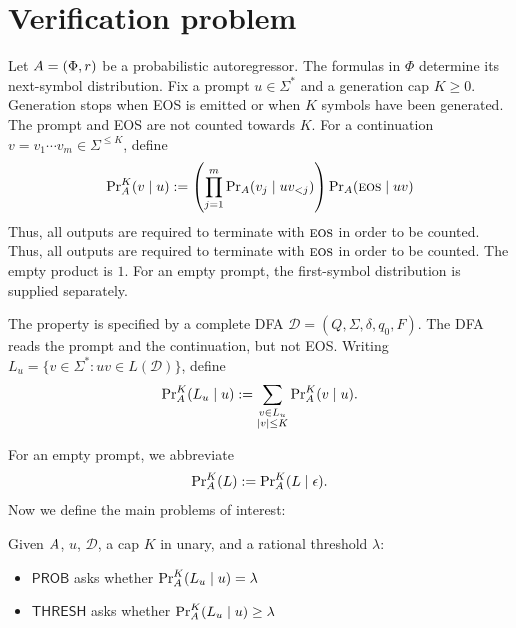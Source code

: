 \documentclass[acmsmall,screen,review,anonymous,nonacm]{PLDI/acmart}
\begin{document}
\section{Verification problem}
\label{sec:verification-problem}

Let $\autoregressor=(\Phi,r)$ be a probabilistic autoregressor.
The formulas in $\Phi$ determine its next-symbol distribution.
Fix a prompt $u\in\Sigma^*$ and a generation cap $K\geq0$.
Generation stops when EOS is emitted or when $K$ symbols have been
generated. The prompt and EOS are not counted towards $K$.
For a continuation $v=v_1\cdots v_m\in\Sigma^{\leq K}$, define
\[
\ksufprob{\autoregressor}{K}{u}{v}
:=\left(\prod_{j=1}^{m}
\symprob{\autoregressor}{uv_{<j}}{v_j}\right)
\symprob{\autoregressor}{uv}{\eos}
\]
Thus, all outputs are required to terminate with $\eos$ in order to be counted.
Thus, all outputs are required to terminate with $\eos$ in order to be counted.
The empty product is $1$. For an empty prompt, the first-symbol
distribution is supplied separately.

The property is specified by a complete DFA
$\mathcal D=(Q,\Sigma,\delta,q_0,F)$.
The DFA reads the prompt and the continuation, but not EOS.
Writing $L_u=\{v\in\Sigma^*:uv\in L(\mathcal D)\}$, define
\[
\ksufprob{\autoregressor}{K}{u}{L_u}
:=
\sum_{\substack{v\in L_u\\|v|\leq K}}
\ksufprob{\autoregressor}{K}{u}{v}.
\]

For an empty prompt, we abbreviate
\[
\kstrprob{\autoregressor}{K}{L}
:=
\ksufprob{\autoregressor}{K}{\epsilon}{L}.
\]
Now we define the main problems of interest:

\begin{definition}
Given $\autoregressor$, $u$, $\mathcal D$, a cap $K$ in unary, and a rational threshold $\lambda$:

\begin{itemize}
    \item $\mathsf{PROB}$ asks whether $\ksufprob{\autoregressor}{K}{u}{L_u}= \lambda$
    \item  $\mathsf{THRESH}$ asks whether $\ksufprob{\autoregressor}{K}{u}{L_u}\geq \lambda$
\end{itemize}
\end{definition}
\end{document}
